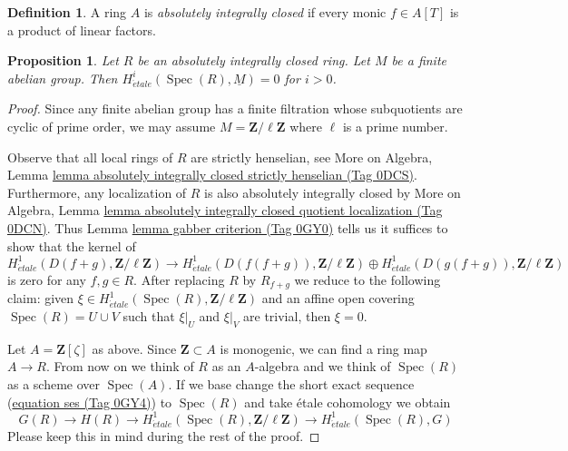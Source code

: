 \documentclass{amsart}
\theoremstyle{plain}
\newtheorem{proposition}[subsection]{Proposition}
\theoremstyle{definition}
\newtheorem{definition}[subsection]{Definition}
\theoremstyle{remark}
\numberwithin{equation}{subsection}
\def\Spec{\mathop{\mathrm{Spec}}}
\def\etale{{\acute{e}tale}}
\begin{document}
\begin{definition}
\label{more-algebra-definition-absolutely-integrally-closed}
A ring $A$ is {\it absolutely integrally closed} if every
monic $f \in A[T]$ is a product of linear factors.
\end{definition}

\begin{proposition}
\label{proposition-aic-vanishing}
Let $R$ be an absolutely integrally closed ring.
Let $M$ be a finite abelian group.
Then $H^i_\etale(\Spec(R), \underline{M}) = 0$ for $i > 0$.
\end{proposition}

\begin{proof}
Since any finite abelian group has a finite filtration whose
subquotients are cyclic of prime order, we may assume
$M = \mathbf{Z}/\ell\mathbf{Z}$ where $\ell$ is a prime number.

\medskip\noindent
Observe that all local rings of $R$ are strictly henselian, see
More on Algebra, Lemma
\href{https://stacks.math.columbia.edu/tag/0DCS}{lemma absolutely integrally closed strictly henselian (Tag 0DCS)}.
Furthermore, any localization of $R$ is also absolutely integrally closed
by More on Algebra, Lemma
\href{https://stacks.math.columbia.edu/tag/0DCN}{lemma absolutely integrally closed quotient localization (Tag 0DCN)}.
Thus Lemma \href{https://stacks.math.columbia.edu/tag/0GY0}{lemma gabber criterion (Tag 0GY0)} tells us it suffices to
show that the kernel of
$$
H^1_\etale(D(f + g), \mathbf{Z}/\ell\mathbf{Z})
\longrightarrow
H^1_\etale(D(f(f + g)), \mathbf{Z}/\ell\mathbf{Z}) \oplus
H^1_\etale(D(g(f + g)), \mathbf{Z}/\ell\mathbf{Z})
$$
is zero for any $f, g \in R$. After replacing $R$ by $R_{f + g}$ we
reduce to the following claim: given
$\xi \in H^1_\etale(\Spec(R), \mathbf{Z}/\ell\mathbf{Z})$
and an affine open covering $\Spec(R) = U \cup V$
such that $\xi|_U$ and $\xi|_V$ are trivial, then $\xi = 0$.

\medskip\noindent
Let $A = \mathbf{Z}[\zeta]$ as above.
Since $\mathbf{Z} \subset A$ is monogenic, we can find a ring
map $A \to R$. From now on we think of $R$ as an $A$-algebra
and we think of $\Spec(R)$ as a scheme over $\Spec(A)$.
If we base change the short exact sequence (\href{https://stacks.math.columbia.edu/tag/0GY4}{equation ses (Tag 0GY4)})
to $\Spec(R)$ and take \'etale cohomology we obtain
$$
G(R) \to H(R) \to
H^1_\etale(\Spec(R), \mathbf{Z}/\ell\mathbf{Z}) \to
H^1_\etale(\Spec(R), G)
$$
Please keep this in mind during the rest of the proof.


\end{proof}
\end{document}
